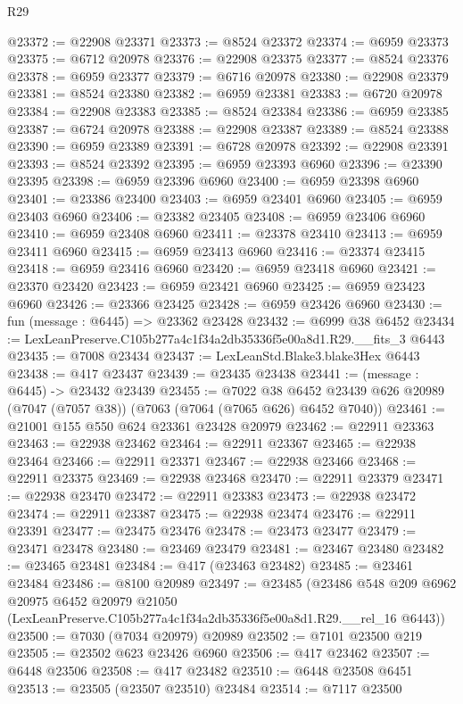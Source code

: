 \begin{lexlean}{R29}
\begin{coremodule}
@23372 := @22908 @23371
@23373 := @8524 @23372
@23374 := @6959 @23373
@23375 := @6712 @20978
@23376 := @22908 @23375
@23377 := @8524 @23376
@23378 := @6959 @23377
@23379 := @6716 @20978
@23380 := @22908 @23379
@23381 := @8524 @23380
@23382 := @6959 @23381
@23383 := @6720 @20978
@23384 := @22908 @23383
@23385 := @8524 @23384
@23386 := @6959 @23385
@23387 := @6724 @20978
@23388 := @22908 @23387
@23389 := @8524 @23388
@23390 := @6959 @23389
@23391 := @6728 @20978
@23392 := @22908 @23391
@23393 := @8524 @23392
@23395 := @6959 @23393 @6960
@23396 := @23390 @23395
@23398 := @6959 @23396 @6960
@23400 := @6959 @23398 @6960
@23401 := @23386 @23400
@23403 := @6959 @23401 @6960
@23405 := @6959 @23403 @6960
@23406 := @23382 @23405
@23408 := @6959 @23406 @6960
@23410 := @6959 @23408 @6960
@23411 := @23378 @23410
@23413 := @6959 @23411 @6960
@23415 := @6959 @23413 @6960
@23416 := @23374 @23415
@23418 := @6959 @23416 @6960
@23420 := @6959 @23418 @6960
@23421 := @23370 @23420
@23423 := @6959 @23421 @6960
@23425 := @6959 @23423 @6960
@23426 := @23366 @23425
@23428 := @6959 @23426 @6960
@23430 := fun (message : @6445) => @23362 @23428
@23432 := @6999 @38 @6452
@23434 := LexLeanPreserve.C105b277a4c1f34a2db35336f5e00a8d1.R29.__fits_3 @6443
@23435 := @7008 @23434
@23437 := LexLeanStd.Blake3.blake3Hex @6443
@23438 := @417 @23437
@23439 := @23435 @23438
@23441 := (message : @6445) -> @23432 @23439
@23455 := @7022
    @38
    @6452
    @23439
    @626
    @20989
    (@7047 (@7057 @38))
    (@7063 (@7064 (@7065 @626) @6452 @7040))
@23461 := @21001 @155 @550 @624 @23361 @23428 @20979
@23462 := @22911 @23363
@23463 := @22938 @23462
@23464 := @22911 @23367
@23465 := @22938 @23464
@23466 := @22911 @23371
@23467 := @22938 @23466
@23468 := @22911 @23375
@23469 := @22938 @23468
@23470 := @22911 @23379
@23471 := @22938 @23470
@23472 := @22911 @23383
@23473 := @22938 @23472
@23474 := @22911 @23387
@23475 := @22938 @23474
@23476 := @22911 @23391
@23477 := @23475 @23476
@23478 := @23473 @23477
@23479 := @23471 @23478
@23480 := @23469 @23479
@23481 := @23467 @23480
@23482 := @23465 @23481
@23484 := @417 (@23463 @23482)
@23485 := @23461 @23484
@23486 := @8100 @20989
@23497 := @23485
    (@23486
      @548
      @209
      @6962
      @20975
      @6452
      @20979
      @21050
      (LexLeanPreserve.C105b277a4c1f34a2db35336f5e00a8d1.R29.__rel_16 @6443))
@23500 := @7030 (@7034 @20979) @20989
@23502 := @7101 @23500 @219
@23505 := @23502 @623 @23426 @6960
@23506 := @417 @23462
@23507 := @6448 @23506
@23508 := @417 @23482
@23510 := @6448 @23508 @6451
@23513 := @23505 (@23507 @23510) @23484
@23514 := @7117 @23500

\end{coremodule}
\end{lexlean}
